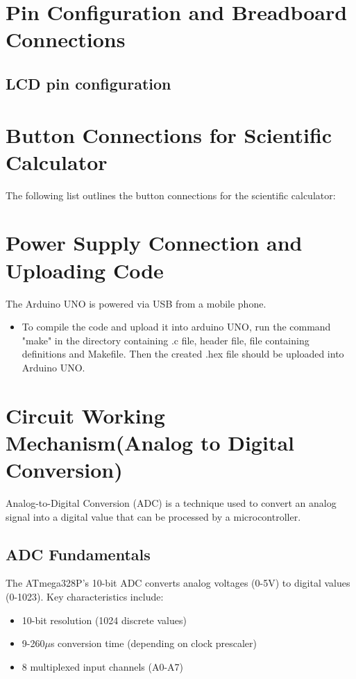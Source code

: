 \documentclass[a4paper,12pt]{article}
\theoremstyle{remark}
\begin{document}
\newpage
\section{Pin Configuration and Breadboard Connections}

\subsection{LCD pin configuration}




\section{Button Connections for Scientific Calculator}

The following list outlines the button connections for the scientific calculator:



\newpage
\section{Power Supply Connection and Uploading Code}
The Arduino UNO is powered via USB from a mobile phone.
\begin{itemize}
    \item To compile the code and upload it into arduino UNO, run the command "make" in the directory containing .c file, header file, file containing definitions and Makefile. Then the created .hex file should be uploaded into Arduino UNO. 
\end{itemize}

\section{Circuit Working Mechanism(Analog to Digital Conversion)}
Analog-to-Digital Conversion (ADC) is a technique used to convert an analog signal into a digital value that can be processed by a microcontroller.
\subsection{ADC Fundamentals}
The ATmega328P's 10-bit ADC converts analog voltages (0-5V) to digital values (0-1023). Key characteristics include:
\begin{itemize}
    \item 10-bit resolution (1024 discrete values)
    \item 9-260$\mu$s conversion time (depending on clock prescaler)
    \item 8 multiplexed input channels (A0-A7)
\end{itemize}
\end{document}

